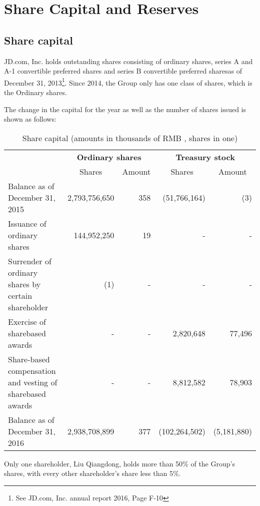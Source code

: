 \section{Share Capital and Reserves}

\subsection{Share capital}

JD.com, Inc. holds outstanding shares consisting of ordinary shares, series A and A-1 convertible preferred shares and series B convertible preferred sharesas of December 31, 2013\footnote{See JD.com, Inc. annual report 2016, Page F-10}. Since 2014, the Group only has one class of shares, which is the Ordinary shares.

The change in the capital for the year as well as the number of shares issued is shown as follows:
\renewcommand{\arraystretch}{0.83}
\begin{table}[H]	
	\begin{center}
		\begin{tabular}{p{5.6cm}rrrr}
			\toprule 
			& \multicolumn{2}{c}{\textbf{Ordinary shares}} & \multicolumn{2}{c}{\textbf{Treasury stock}} \\\cmidrule(lr){2-3} \cmidrule(lr){4-5} 
			\multirow{-2}{*}{} &\multicolumn{1}{c}{Shares}&Amount&\multicolumn{1}{c}{Shares}&\multicolumn{1}{c}{Amount}\\
		\midrule
		\rowcolor[gray]{.96}	
		Balance as of
		December 31,
		2015&2,793,756,650&358&(51,766,164)&(3)\\
		Issuance of ordinary shares&144,952,250&19&-&-\\
		\rowcolor[gray]{.96}
		Surrender of ordinary shares by certain	shareholder&(1)&-&-&-\\
		Exercise of sharebased	awards&-&-&2,820,648&77,496\\
		\rowcolor[gray]{.96}
		Share-based	compensation and vesting of sharebased	awards&-&-&8,812,582&78,903\\
		Balance as of December 31, 2016&2,938,708,899&377&(102,264,502)&(5,181,880)\\
		\bottomrule
		\end{tabular}
	\end{center}
	\caption{Share capital (amounts in thousands of RMB \textyen, shares in one)}\label{table:1}
\end{table}


Only one shareholder, Liu Qiangdong, holds more than 50\% of the Group’s shares, with every other shareholder's share less than 5\%.

